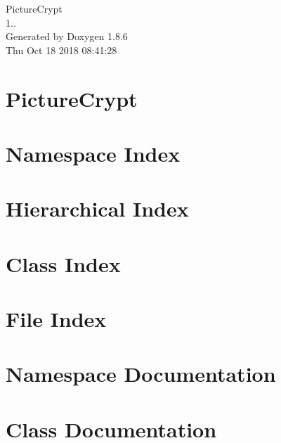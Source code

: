 \documentclass[twoside]{book}
\newcommand{\clearemptydoublepage}{%
  \newpage{\pagestyle{empty}\cleardoublepage}%
}
\begin{document}
\hypersetup{pageanchor=false}
\begin{titlepage}
\vspace*{7cm}
\begin{center}%
{\Large Picture\-Crypt \\[1ex]\large 1.. }\\
\vspace*{1cm}
{\large Generated by Doxygen 1.8.6}\\
\vspace*{0.5cm}
{\small Thu Oct 18 2018 08:41:28}\\
\end{center}
\end{titlepage}
\clearemptydoublepage
\tableofcontents
\clearemptydoublepage
{}
\hypersetup{pageanchor=true}

\chapter{Picture\-Crypt}
\label{index}\hypertarget{index}{}
\chapter{Namespace Index}

\chapter{Hierarchical Index}

\chapter{Class Index}

\chapter{File Index}

\chapter{Namespace Documentation}



\chapter{Class Documentation}







\end{document}
